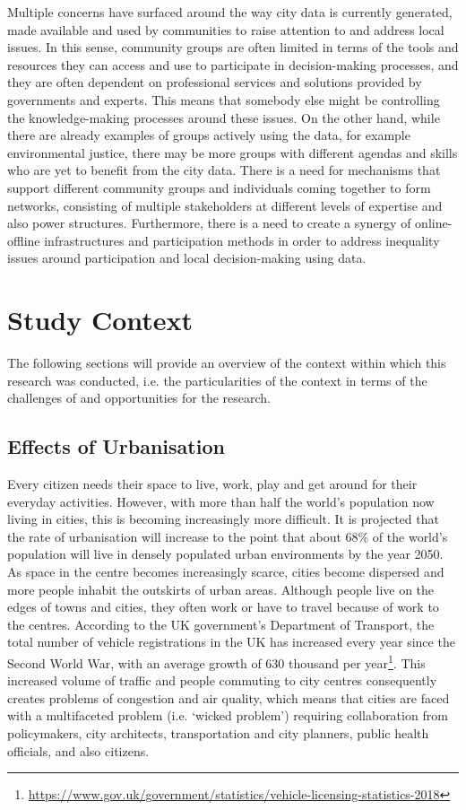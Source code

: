 \noindent
Multiple concerns have surfaced around the way city data is currently generated, made available and used by communities to raise attention to and address local issues. In this sense, community groups are often limited in terms of the tools and resources they can access and use to participate in decision-making processes, and they are often dependent on professional services and solutions provided by governments and experts. This means that somebody else might be controlling the knowledge-making processes around these issues. On the other hand, while there are already examples of groups actively using the data, for example environmental justice, there may be more groups with different agendas and skills who are yet to benefit from the city data. There is a need for mechanisms that support different community groups and individuals coming together to form networks, consisting of multiple stakeholders at different levels of expertise and also power structures. Furthermore, there is a need to create a synergy of online-offline infrastructures and participation methods in order to address inequality issues around participation and local decision-making using data.

\section{Study Context}
\label{sec:sms-contex}
The following sections will provide an overview of the context within which this research was conducted, i.e. the particularities of the context in terms of the challenges of and opportunities for the research.

\subsection{Effects of Urbanisation}
\label{sub:urbanisation}
Every citizen needs their space to live, work, play and get around for their everyday activities. However, with more than half the world's population now living in cities, this is becoming increasingly more difficult. It is projected that the rate of urbanisation will increase to the point that about 68\% \citep{ritchie_urbanization_2018} of the world's population will live in densely populated urban environments by the year 2050. As space in the centre becomes increasingly scarce, cities become dispersed and more people inhabit the outskirts of urban areas. Although people live on the edges of towns and cities, they often work or have to travel because of work to the centres. According to the UK government's Department of Transport, the total number of vehicle registrations in the UK has increased every year since the Second World War, with an average growth of 630 thousand per year\footnote{\url{https://www.gov.uk/government/statistics/vehicle-licensing-statistics-2018}}. This increased volume of traffic and people commuting to city centres consequently creates problems of congestion and air quality, which means that cities are faced with a multifaceted problem (i.e. `wicked problem') requiring collaboration from policymakers, city architects, transportation and city planners, public health officials, and also citizens.

